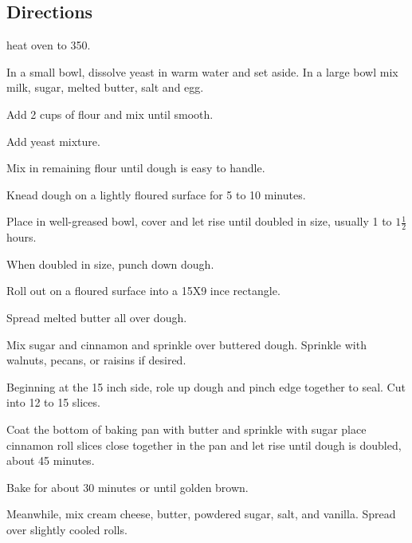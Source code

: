 \documentclass{book}
\begin{document}
\subsection*{Directions}
\begin{numerize}
\item
heat oven to 350.
\item
In a small bowl, dissolve yeast in warm water and set aside. In a large bowl mix milk, sugar, melted butter, salt and egg.
\item
Add 2 cups of flour and mix until smooth.
\item
Add yeast mixture.
\item
Mix in remaining flour until dough is easy to handle.
\item
Knead dough on a lightly floured surface for 5 to 10 minutes.
\item
Place in well-greased bowl, cover and let rise until doubled in size, usually 1 to $1 \frac{1}{2}$ hours.
\item
When doubled in size, punch down dough.
\item
Roll out on a floured surface into a 15X9 ince rectangle.
\item
Spread melted butter all over dough.
\item
Mix sugar and cinnamon and sprinkle over buttered dough. Sprinkle with walnuts, pecans, or raisins if desired.
\item
Beginning at the 15 inch side, role up dough and pinch edge together to seal. Cut into 12 to 15 slices.
\item
Coat the bottom of baking pan with butter and sprinkle with sugar place cinnamon roll slices close together in the pan and let rise until dough is doubled, about 45 minutes.
\item
Bake for about 30 minutes or until golden brown.
\item
Meanwhile, mix cream cheese, butter, powdered sugar, salt, and vanilla. Spread over slightly cooled rolls.
\end{numerize}
\newpage
\end{document}
